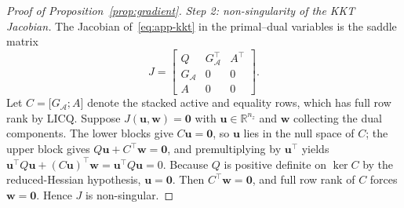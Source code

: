 \documentclass[11pt]{article}
\theoremstyle{plain}
\theoremstyle{definition}
\newcommand{\R}{\mathbb{R}}
\begin{document}
\begin{proof}[Proof of Proposition~\ref{prop:gradient}]
	\emph{Step 2: non-singularity of the KKT Jacobian.} The Jacobian
	of~\eqref{eq:app-kkt} in the primal--dual variables is the saddle
	matrix
	\begin{equation}
		\label{eq:app-jac}
		J=
		\begin{bmatrix}
			Q                  & G_{\mathcal{A}}^{\top} & A^{\top} \\
			G_{\mathcal{A}}    & 0                      & 0        \\
			A                  & 0                      & 0
		\end{bmatrix}.
	\end{equation}
	Let $C=\big[G_{\mathcal{A}};A\big]$ denote the stacked active and
	equality rows, which has full row rank by LICQ. Suppose
	$J(\bm{u},\bm{w})=\bm{0}$ with $\bm{u}\in\R^{n_z}$ and $\bm{w}$
	collecting the dual components. The lower blocks give
	$C\bm{u}=\bm{0}$, so $\bm{u}$ lies in the null space of $C$; the
	upper block gives $Q\bm{u}+C^{\top}\bm{w}=\bm{0}$, and premultiplying
	by $\bm{u}^{\top}$ yields
	$\bm{u}^{\top}Q\bm{u}+(C\bm{u})^{\top}\bm{w}
		=\bm{u}^{\top}Q\bm{u}=0$. Because $Q$ is positive definite on
	$\ker C$ by the reduced-Hessian hypothesis, $\bm{u}=\bm{0}$. Then
	$C^{\top}\bm{w}=\bm{0}$, and full row rank of $C$ forces
	$\bm{w}=\bm{0}$. Hence $J$ is non-singular.


\end{proof}
\end{document}
